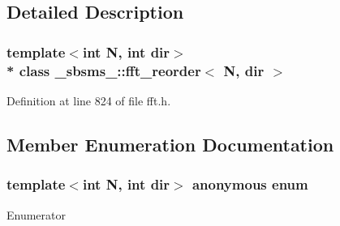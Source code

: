 \subsection{Detailed Description}
\subsubsection*{template$<$int N, int dir$>$\\*
class \+\_\+sbsms\+\_\+\+::fft\+\_\+reorder$<$ N, dir $>$}



Definition at line 824 of file fft.\+h.



\subsection{Member Enumeration Documentation}
\subsubsection[{\texorpdfstring{anonymous enum}{anonymous enum}}]{\setlength{\rightskip}{0pt plus 5cm}template$<$int N, int dir$>$ anonymous enum}\hypertarget{class__sbsms___1_1fft__reorder_a2dc87d917c8d4e7f86d10e777ea42aee}{}\label{class__sbsms___1_1fft__reorder_a2dc87d917c8d4e7f86d10e777ea42aee}
\begin{Desc}
\item[Enumerator]\par
\begin{description}
\item[{\em 
radix\hypertarget{class__sbsms___1_1fft__reorder_a2dc87d917c8d4e7f86d10e777ea42aeea17bb756d118b26ba061831d168c7c1c0}{}\label{class__sbsms___1_1fft__reorder_a2dc87d917c8d4e7f86d10e777ea42aeea17bb756d118b26ba061831d168c7c1c0}
}]\item[{\em 
ostride\hypertarget{class__sbsms___1_1fft__reorder_a2dc87d917c8d4e7f86d10e777ea42aeea3d023c6c746928ed4a6e6df33ccaaad0}{}\label{class__sbsms___1_1fft__reorder_a2dc87d917c8d4e7f86d10e777ea42aeea3d023c6c746928ed4a6e6df33ccaaad0}
}]\item[{\em 
s\hypertarget{class__sbsms___1_1fft__reorder_a2dc87d917c8d4e7f86d10e777ea42aeea12e5addd44ed4f851adf0ed02c63ecc5}{}\label{class__sbsms___1_1fft__reorder_a2dc87d917c8d4e7f86d10e777ea42aeea12e5addd44ed4f851adf0ed02c63ecc5}
}]\end{description}
\end{Desc}


